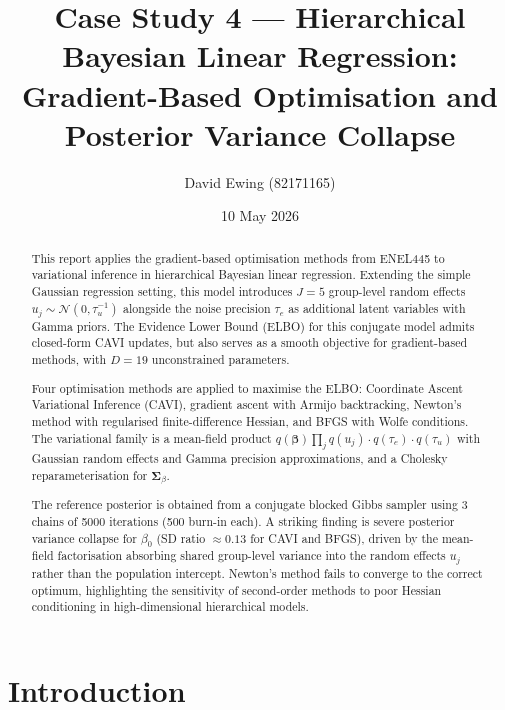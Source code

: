 \documentclass[11pt,a4paper]{article}
\title{
Case Study 4 --- Hierarchical Bayesian Linear Regression:\\[0.4em]
Gradient-Based Optimisation and Posterior Variance Collapse
}
\author{
  David Ewing (82171165)
}
\date{10 May 2026}
\begin{document}
\maketitle

\begin{abstract}
\setlength{\parindent}{0pt}
\setlength{\parskip}{0.7em}

This report applies the gradient-based optimisation methods from ENEL445 to variational
inference in hierarchical Bayesian linear regression.
Extending the simple Gaussian regression setting, this model introduces $J=5$ group-level
random effects $u_j \sim \mathcal{N}(0,\tau_u^{-1})$ alongside the noise precision
$\tau_e$ as additional latent variables with Gamma priors.
The Evidence Lower Bound (ELBO) for this conjugate model admits closed-form CAVI updates,
but also serves as a smooth objective for gradient-based methods, with $D=19$ unconstrained
parameters.

Four optimisation methods are applied to maximise the ELBO:
Coordinate Ascent Variational Inference (CAVI), gradient ascent with Armijo backtracking,
Newton's method with regularised finite-difference Hessian, and BFGS with Wolfe conditions.
The variational family is a mean-field product
$q(\bm{\beta})\prod_j q(u_j) \cdot q(\tau_e)\cdot q(\tau_u)$
with Gaussian random effects and Gamma precision approximations, and a
Cholesky reparameterisation for $\bm{\Sigma}_\beta$.

The reference posterior is obtained from a conjugate blocked Gibbs sampler
using 3 chains of 5000 iterations (500 burn-in each).
A striking finding is severe posterior variance collapse for $\beta_0$
(SD ratio $\approx 0.13$ for CAVI and BFGS), driven by the mean-field factorisation
absorbing shared group-level variance into the random effects $u_j$ rather than
the population intercept.
Newton's method fails to converge to the correct optimum, highlighting the
sensitivity of second-order methods to poor Hessian conditioning in high-dimensional
hierarchical models.

\end{abstract}

\newpage

\section*{Introduction}
\end{document}
